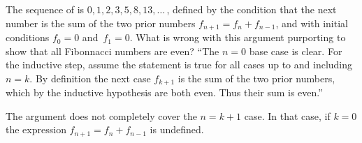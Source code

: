 \documentclass{ibl}
\begin{document}
\begin{ex}
The sequence of  is
$0,1,2,3,5,8,13, \ldots$\,, defined by the condition that 
the next number is the sum of the 
two prior numbers $f_{n+1}=f_n+f_{n-1}$, and with initial conditions
$f_0=0$ and~$f_1=0$.
What is wrong with this argument purporting to show that
all Fibonnacci numbers are even?
``The $n=0$ base case is clear.  For the inductive step, assume the statement 
is true for all cases up to and including $n=k$.
By definition 
the next case $f_{k+1}$ is the sum of the two prior numbers, which by
the inductive hypothesis are both even.  
Thus their sum is even.''   
\begin{ans}
The argument does not completely cover the $n=k+1$ case.
In that case, if $k=0$ the expression $f_{n+1}=f_n+f_{n-1}$ is undefined.  
\end{ans}
\end{ex}
\end{document}
